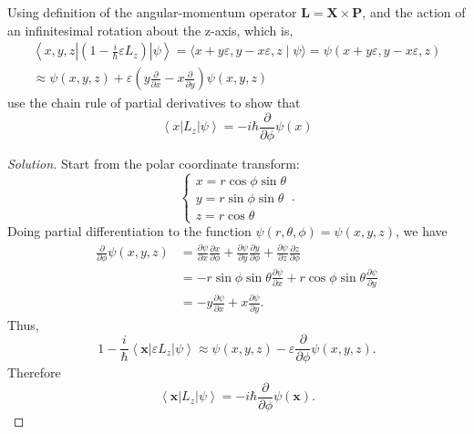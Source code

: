 \begin{problem}
	Using definition of the angular-momentum operator $\boldsymbol{L}=\boldsymbol{X} \times \boldsymbol{P}$, and the action of an infinitesimal rotation about the z-axis, which is,
\[
\begin{gathered}
\left\langle x, y, z\left|\left(1-\frac{i}{\hbar} \varepsilon L_z\right)\right| \psi\right\rangle=\langle x+y \varepsilon, y-x \varepsilon, z \mid \psi\rangle=\psi(x+y \varepsilon, y-x \varepsilon, z) \\
\approx \psi(x, y, z)+\varepsilon\left(y \frac{\partial}{\partial x}-x \frac{\partial}{\partial y}\right) \psi(x, y, z)
\end{gathered}
\]
use the chain rule of partial derivatives to show that
\[
\left\langle x\left|L_z\right| \psi\right\rangle=-i \hbar \frac{\partial}{\partial \phi} \psi(x)
\]
\end{problem}
\begin{proof}[Solution]
	Start from the polar coordinate transform:
	\[
		\begin{cases}
			x = r \cos \phi \sin \theta \\
			y = r \sin \phi \sin \theta \\
			z = r \cos \theta
		\end{cases}
	.\] 
	Doing partial differentiation to the function $\psi(r,\theta, \phi) = \psi(x,y,z)$, we have
	\begin{align*}
		\frac{\partial }{\partial \phi} \psi(x,y,z)
		&= \frac{\partial \psi}{\partial x} \frac{\partial x}{\partial \phi} + \frac{\partial \psi}{\partial y} \frac{\partial y}{\partial \phi}  + \frac{\partial \psi}{\partial z} \frac{\partial z}{\partial \phi} \\
		&= - r \sin \phi \sin \theta \frac{\partial \psi}{\partial x}  + r \cos \phi \sin \theta \frac{\partial \psi}{\partial y} \\
		&= - y \frac{\partial \psi}{\partial x}  + x \frac{\partial \psi}{\partial y} 
	.\end{align*} 
	Thus,
	\[
		1 - \frac{i}{\hbar} \left\langle \mathbf{x} \right| \varepsilon L_z \left| \psi \right\rangle 
		\approx \psi(x,y,z) - \varepsilon \frac{\partial }{\partial \phi} \psi(x,y,z)
	.\] 
	Therefore
	\[
		\left\langle \mathbf{x} \right| L_z \left| \psi \right\rangle 
		= - i \hbar \frac{\partial }{\partial \phi} \psi(\mathbf{x})
	.\] 
\end{proof}


